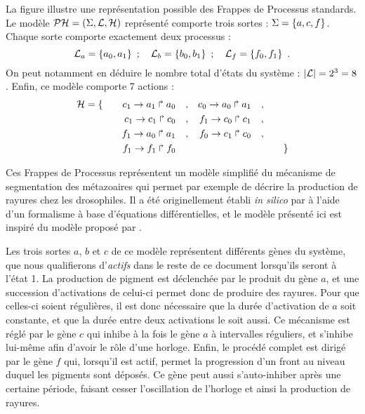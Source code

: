 \begin{example}
  La figure  illustre une représentation possible des
  Frappes de Processus standards.
  Le modèle $\mathcal{PH} = (\Sigma, \mathcal{L}, \mathcal{H})$ représenté comporte trois sortes :
  $\Sigma = \{ a, c, f \}$.
  Chaque sorte comporte exactement deux processus :
  \[\mathcal{L}_a = \{ a_0, a_1 \} \enspace;\quad
    \mathcal{L}_b = \{ b_0, b_1 \} \enspace;\quad
    \mathcal{L}_f = \{ f_0, f_1 \} \enspace.\]
  On peut notamment en déduire le nombre total d'états du système :
  $|\mathcal{L}| = 2^3 = 8$.
  Enfin, ce modèle comporte 7 actions :
  \begin{align*}
    \mathcal{H} = \{\qquad
      c_1\rightarrow a_1\Rsh a_0\quad, && c_0\rightarrow a_0\Rsh a_1\quad,& \\
      c_1\rightarrow c_1\Rsh c_0\quad, && f_1\rightarrow c_0\Rsh c_1\quad,& \\
      f_1\rightarrow a_0\Rsh a_1\quad, && f_0\rightarrow c_1\Rsh c_0\quad,& \\
      f_1\rightarrow f_1\Rsh f_0\quad\; &&& 
    \qquad\}
  \end{align*}
  
  Ces Frappes de Processus représentent un modèle simplifié du mécanisme
  de segmentation des métazoaires qui permet par exemple de décrire la production de rayures
  chez les drosophiles.
  Il a été originellement établi \textit{in silico} par 
  à l'aide d'un formalisme à base d'équations différentielles,
  et le modèle présenté ici est inspiré du modèle proposé par .
  
  Les trois sortes $a$, $b$ et $c$ de ce modèle représentent différents gènes du système,
  que nous qualifierons d'\emph{actifs} dans le reste de ce document lorsqu'ils seront à l'état 1.
  La production de pigment est déclenchée par le produit du gène $a$,
  et une succession d'activations de celui-ci permet donc de produire des rayures.
  Pour que celles-ci soient régulières, il est donc nécessaire que la durée d'activation
  de $a$ soit constante, et que la durée entre deux activations le soit aussi.
  Ce mécanisme est réglé par le gène $c$ qui inhibe à la fois le gène $a$ à intervalles réguliers,
  et s'inhibe lui-même afin d'avoir le rôle d'une horloge.
  Enfin, le procédé complet est dirigé par le gène $f$ qui, lorsqu'il est actif,
  permet la progression d'un front au niveau duquel les pigments sont déposés.
  Ce gène peut aussi s'auto-inhiber après une certaine période, faisant cesser
  l'oscillation de l'horloge et ainsi la production de rayures.
  

\end{example}
